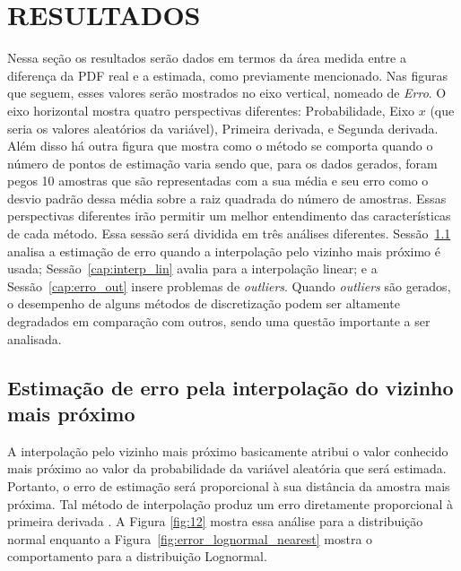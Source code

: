 \chapter{RESULTADOS} \label{cap:resultados}
\vspace{-2cm}
Nessa seção os resultados serão dados em termos da área medida entre a diferença da \ac{PDF} real e a estimada, como previamente mencionado. Nas figuras que seguem, esses valores serão mostrados no eixo vertical, nomeado de \textit{Erro}. O eixo horizontal mostra quatro perspectivas diferentes: Probabilidade, Eixo $ x $ (que seria os valores aleatórios da variável), Primeira derivada, e Segunda derivada. Além disso há outra figura que mostra como o método se comporta quando o número de pontos de estimação varia sendo que, para os dados gerados, foram pegos 10 amostras que são representadas com a sua média e seu erro como o desvio padrão dessa média sobre a raiz quadrada do número de amostras. Essas perspectivas diferentes irão permitir um melhor entendimento das características de cada método. Essa sessão será dividida em três análises diferentes. Sessão~\ref{cap:interp_neares} analisa a estimação de erro quando a interpolação pelo vizinho mais próximo é usada; Sessão~\ref{cap:interp_lin} avalia para a interpolação linear; e a Sessão~\ref{cap:erro_out} insere problemas de \textit{outliers}. Quando \textit{outliers} são gerados, o desempenho de alguns métodos de discretização podem ser altamente degradados em comparação com outros, sendo uma questão importante a ser analisada.

\section{Estimação de erro pela interpolação do vizinho mais próximo} \label{cap:interp_neares}
A interpolação pelo vizinho mais próximo basicamente atribui o valor conhecido mais próximo ao valor da probabilidade da variável aleatória que será estimada. Portanto, o erro de estimação será proporcional à sua distância da amostra mais próxima. Tal método de interpolação produz um erro diretamente proporcional à primeira derivada \cite{gurevich1966integral}. A Figura \ref{fig:12} mostra essa análise para a distribuição normal enquanto a Figura~\ref{fig:error_lognormal_nearest} mostra o comportamento para a distribuição Lognormal.  

